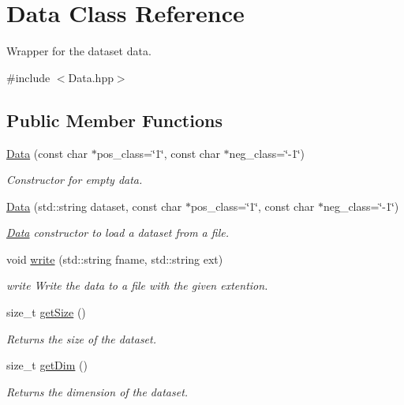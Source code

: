 \hypertarget{class_data}{}\section{Data Class Reference}
\label{class_data}


Wrapper for the dataset data.  




{\ttfamily \#include $<$Data.\+hpp$>$}

\subsection*{Public Member Functions}
\begin{DoxyCompactItemize}
\item 
\hyperlink{class_data_aa3ca35c963eec5a4734df23f88443077}{Data} (const char $\ast$pos\+\_\+class=\char`\"{}1\char`\"{}, const char $\ast$neg\+\_\+class=\char`\"{}-\/1\char`\"{})
\begin{DoxyCompactList}\small\item\em Constructor for empty data. \end{DoxyCompactList}\item 
\hyperlink{class_data_a85afba1f115dce4b6d2a952326624dd4}{Data} (std\+::string dataset, const char $\ast$pos\+\_\+class=\char`\"{}1\char`\"{}, const char $\ast$neg\+\_\+class=\char`\"{}-\/1\char`\"{})
\begin{DoxyCompactList}\small\item\em \hyperlink{class_data}{Data} constructor to load a dataset from a file. \end{DoxyCompactList}\item 
void \hyperlink{class_data_a6550f72555320ae9225ba216a9f4e7b3}{write} (std\+::string fname, std\+::string ext)
\begin{DoxyCompactList}\small\item\em write Write the data to a file with the given extention. \end{DoxyCompactList}\item 
size\+\_\+t \hyperlink{class_data_a269f9d89ef47b9cf30454cd88c8ccf65}{get\+Size} ()
\begin{DoxyCompactList}\small\item\em Returns the size of the dataset. \end{DoxyCompactList}\item 
size\+\_\+t \hyperlink{class_data_a7aba855040506ff3c7ce6ffb2b2773b4}{get\+Dim} ()
\begin{DoxyCompactList}\small\item\em Returns the dimension of the dataset. \end{DoxyCompactList}\item 

\end{DoxyCompactItemize}
